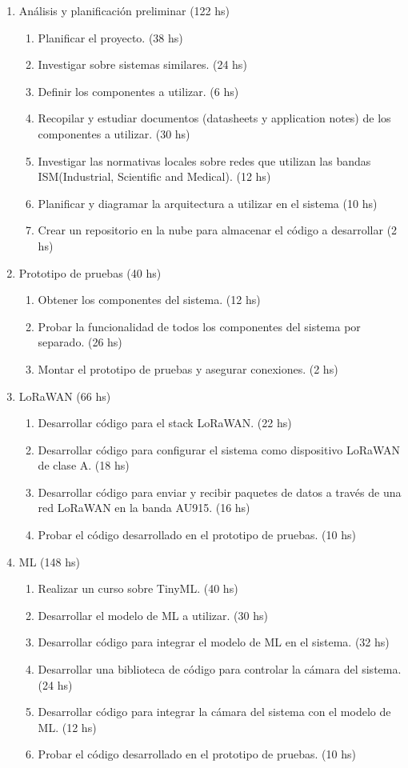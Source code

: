 \documentclass[
11pt, %
]{plan}
\begin{document}
\begin{enumerate}
\item Análisis y planificación preliminar (122 hs)
	\begin{enumerate}
		\item Planificar el proyecto. (38 hs)
		\item Investigar sobre sistemas similares. (24 hs)
		\item Definir los componentes a utilizar. (6 hs)
		\item Recopilar y estudiar documentos (datasheets y application notes) de los componentes a utilizar. (30 hs)
		\item Investigar las normativas locales sobre redes que utilizan las bandas ISM(Industrial, Scientific and Medical). (12 hs)
		\item Planificar y diagramar la arquitectura a utilizar en el sistema (10 hs)
		\item Crear un repositorio en la nube para almacenar el código a desarrollar (2 hs)
	\end{enumerate}
	
\item Prototipo de pruebas (40 hs)
	\begin{enumerate}
		\item Obtener los componentes del sistema. (12 hs)
		\item Probar la funcionalidad de todos los componentes del sistema por separado. (26 hs)
		\item Montar el prototipo de pruebas y asegurar conexiones. (2 hs)
	\end{enumerate}
	
\item LoRaWAN (66 hs)
	\begin{enumerate}
		\item Desarrollar código para el stack LoRaWAN. (22 hs)
		\item Desarrollar código para configurar el sistema como dispositivo LoRaWAN de clase A. (18 hs)
		\item Desarrollar código para enviar y recibir paquetes de datos a través de una red LoRaWAN en la banda AU915. (16 hs)
		\item Probar el código desarrollado en el prototipo de pruebas. (10 hs)
	\end{enumerate}
	
\item ML (148 hs)
	\begin{enumerate}
		\item Realizar un curso sobre TinyML. (40 hs)
		\item Desarrollar el modelo de ML a utilizar. (30 hs)
		\item Desarrollar código para integrar el modelo de ML en el sistema. (32 hs)
		\item Desarrollar una biblioteca de código para controlar la cámara del sistema. (24 hs)
		\item Desarrollar código para integrar la cámara del sistema con el modelo de ML. (12 hs)
		\item Probar el código desarrollado en el prototipo de pruebas. (10 hs)
	\end{enumerate}


\end{enumerate}
\end{document}
